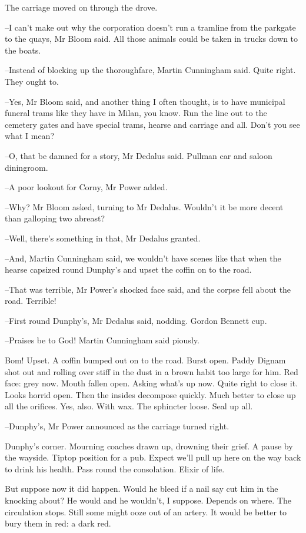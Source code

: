 The carriage moved on through the drove.

--I can't make out why the corporation doesn't run a tramline
from the parkgate to the quays,
Mr Bloom said.
All those animals could be taken in trucks down to the boats.

--Instead of blocking up the thoroughfare,
Martin Cunningham said.
Quite right.
They ought to.

--Yes,
Mr Bloom said,
and another thing I often thought,
is to have municipal funeral trams like they have in Milan, you know.
Run the line out to the cemetery gates and have special trams,
hearse and carriage and all.
Don't you see what I mean?

--O, that be damned for a story,
Mr Dedalus said.
Pullman car and saloon diningroom.

--A poor lookout for Corny,
Mr Power added.

--Why?
Mr Bloom asked, turning to Mr Dedalus.
Wouldn't it be more decent than galloping two abreast?

--Well, there's something in that,
Mr Dedalus granted.

--And,
Martin Cunningham said,
we wouldn't have scenes like that
when the hearse capsized round Dunphy's
and upset the coffin on to the road.

--That was terrible,
Mr Power's shocked face said,
and the corpse fell about the road.
Terrible!

--First round Dunphy's,
Mr Dedalus said, nodding.
Gordon Bennett cup.

--Praises be to God!
Martin Cunningham said piously.

Bom!
Upset.
A coffin bumped out on to the road.
Burst open.
Paddy Dignam shot out and rolling over stiff in the dust
in a brown habit too large for him.
Red face:
grey now.
Mouth fallen open.
Asking what's up now.
Quite right to close it.
Looks horrid open.
Then the insides decompose quickly.
Much better to close up all the orifices.
Yes, also.
With wax.
The sphincter loose.
Seal up all.

--Dunphy's,
Mr Power announced
as the carriage turned right.

Dunphy's corner.
Mourning coaches drawn up, drowning their grief.
A pause by the wayside.
Tiptop position for a pub.
Expect we'll pull up here on the way back to drink his health.
Pass round the consolation.
Elixir of life.

But suppose now it did happen.
Would he bleed if a nail say cut him in the knocking about?
He would and he wouldn't, I suppose.
Depends on where.
The circulation stops.
Still some might ooze out of an artery.
It would be better to bury them in red:
a dark red.

